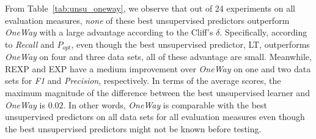\documentclass[sigconf]{acmart}
\theoremstyle{break}
\newcommand{\tab}[1]{Table~\ref{tab:#1}}
\begin{document}
From \tab{unsu_oneway}, we observe that out of 24 experiments on all evaluation measures, 
{\it none} of these best unsupervised predictors outperform {\it OneWay} with a large advantage according
to the Cliff's $\delta$. Specifically,  according to {\it Recall} and $P_{opt}$,
even though the best unsupervised predictor, LT, outperforms {\it OneWay} on four and three data sets, all of
these advantage are small. Meanwhile, REXP and EXP have a medium improvement
over {\it OneWay} on one and two data sets for {\it F1} and {\it Precision}, respectively.
In terms of the average scores, the maximum magnitude of the difference between the best unsupervised 
learner and {\it OneWay} is $0.02$. In other words, {\it OneWay} is comparable with the best unsupervised predictors on all data sets for all evaluation measures even though the best unsupervised predictors might not be known before testing. 




\begin{table}[]
    \centering
    \caption{Best unsupervised predictor~(A) vs. OneWay~(B). The colorful cell indicates the size effect: green for large; yellow for medium; gray for small.}
    \label{tab:unsu_oneway}
\end{table}
\end{document}
